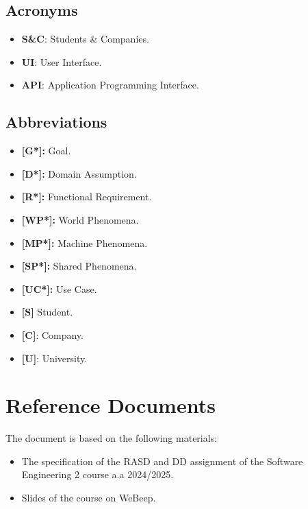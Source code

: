 \subsection{Acronyms}
\label{subsec:acronyms}%

\begin{itemize}
\item
  \textbf{S\&C}: Students \& Companies.
\item
  \textbf{UI}: User Interface.
\item
  \textbf{API}: Application Programming Interface.
\end{itemize}

\subsection{Abbreviations}
\label{subsec:abbreviations}%

\begin{itemize}
\item
  \textbf{[G*]:} Goal.
\item
  \textbf{[D*]:} Domain Assumption.
\item
  \textbf{[R*]:} Functional Requirement.
\item
  \textbf{[WP*]:} World Phenomena.
\item
  \textbf{[MP*]:} Machine Phenomena.
\item
  \textbf{[SP*]:} Shared Phenomena.
\item
  \textbf{[UC*]:} Use Case.
\item
  \textbf{[S]} Student.
\item
  \textbf{[C]}: Company.
\item
  \textbf{[U]}: University.
\end{itemize}



\section{Reference Documents}
\label{sec:reference_documents}%

The document is based on the following materials:

\begin{itemize}
\item
  The specification of the RASD and DD assignment of the Software Engineering 2 course a.a 2024/2025.
\item
  Slides of the course on WeBeep.
\end{itemize}

